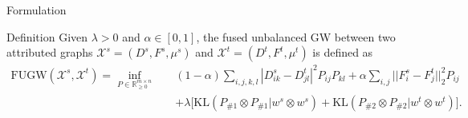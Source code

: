 \documentclass{beamer}
\newcommand{\fugw}{\text{FUGW}}
\newcommand{\kl}{\text{KL}}
\newcommand{\cX}{\mathcal X}
\newcommand{\bbR}{\mathbb R}
\begin{document}
\begin{frame}{Formulation}
\scriptsize
\vspace{-0.7cm}
\begin{block}{Definition}
  Given $\lambda > 0$ and $\alpha \in [0, 1]$, the fused unbalanced GW
  between two attributed graphs $\cX^s = (D^s, F^s, \mu^s)$ and
  $\cX^t = (D^t, F^t, \mu^t)$ is defined as
\begin{align*}
  \fugw(\cX^s, \cX^t) = \inf_{P \in \bbR^{m \times n}_{\geq 0}} \quad
  &(1 - \alpha) \sum_{i,j,k,l} | D^s_{ik} - D^t_{jl}|^2 P_{ij} P_{kl}
  + \alpha \sum_{i,j} || F^s_i - F^t_j||_2^2 P_{ij} \\
  &+ \lambda \Big[ \kl(P_{\# 1} \otimes P_{\# 1} \vert w^s \otimes w^s)
  + \kl(P_{\# 2} \otimes P_{\# 2} \vert w^t \otimes w^t) \Big].
\end{align*}
\end{block}



\end{frame}
\end{document}

